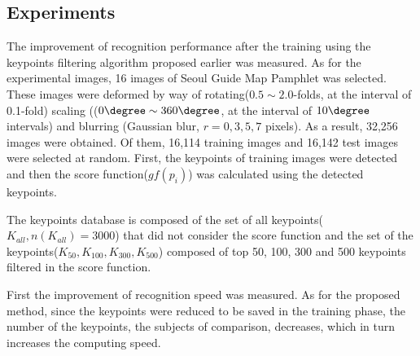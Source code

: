 

\subsection{Experiments}



The improvement of recognition performance after the training using the keypoints filtering algorithm proposed earlier was measured. As for the experimental images, 16 images of Seoul Guide Map Pamphlet was selected. These images were deformed by way of rotating($0.5\sim2.0$-folds, at the interval of 0.1-fold) scaling (($0\degree\sim360\degree$, at the interval of $10\degree$ intervals) and blurring (Gaussian blur, $r = 0,3,5,7$ pixels). As a result, 32,256 images were obtained. Of them, 16,114 training images and 16,142 test images were selected at random. First, the keypoints of training images were detected and then the score function($gf(p_i)$) was calculated using the detected keypoints. 


The keypoints database is composed of the set of all keypoints($K_{all}, n(K_{all}) = 3000$) that did not consider the score function and the set of the keypoints($K_{50}, K_{100}, K_{300}, K_{500}$) composed of top 50, 100, 300 and 500 keypoints filtered in the score function. 


First the improvement of recognition speed was measured. As for the proposed method, since the keypoints were reduced to be saved in the training phase, the number of the keypoints, the subjects of comparison, decreases, which in turn increases the computing speed. 

